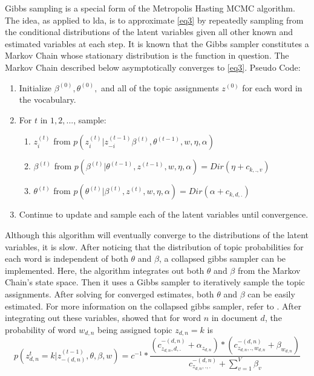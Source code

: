 \documentclass[3p,times]{elsarticle}
\begin{document}
\noindent Gibbs sampling is a special form of the Metropolis Hasting MCMC algorithm. The idea, as applied to lda, is to approximate \ref{eq3} by repeatedly sampling from the conditional distributions of the latent variables given all other known and estimated variables at each step. It is known that the Gibbs sampler constitutes a Markov Chain whose stationary distribution is the function in question. The Markov Chain described below asymptotically converges to \ref{eq3}. Pseudo Code:
\begin{enumerate}
	\item Initialize $\beta^{(0)}, \theta^{(0)},$ and all of the topic assignments $z^{(0)}$ for each word in the vocabulary.
	\item For $t$ in $1,2,...$, sample:
	\begin{enumerate}
		\item $z^{(t)}_{i}$ from $p(z_{i}^{(t)} | z^{(t-1)}_{-i} \beta^{(t)}, \theta^{(t-1)}, w, \eta, \alpha)$
		\item $\beta^{(t)}$ from $p(\beta^{(t)} | \theta^{(t-1)}, z^{(t-1)}, w, \eta, \alpha)=Dir(\eta+c_{k,.,v})$
		\item $\theta^{(t)}$ from $p(\theta^{(t)} | \beta^{(t)}, z^{(t)}, w, \eta, \alpha)=Dir(\alpha+c_{k,d,.})$
	\end{enumerate}
	\item Continue to update and sample each of the latent variables until convergence.
\end{enumerate}


\noindent Although this algorithm will eventually converge to the distributions of the latent variables, it is slow. After noticing that the distribution of topic probabilities for each word is independent of both $\theta$ and $\beta$, a collapsed gibbs sampler can be implemented. Here, the algorithm integrates out both $\theta$ and $\beta$ from the Markov Chain's state space. Then it uses a Gibbs sampler to iteratively sample the topic assignments. After solving for converged estimates, both $\theta$ and $\beta$ can be easily estimated. For more information on the collapsed gibbs sampler, refer to \cite{CGSTheory}. After integrating out these variables, \cite{multinom} showed that for word $n$ in document $d$, the probability of word $w_{d,n}$ being assigned topic $z_{d,n}=k$ is 
\begin{equation} \label{eq4}
p( z^{t}_{d,n}=k| z^{(t-1)}_{-(d,n)}, \theta, \beta, w) =c^{-1}*\frac{(c^{-(d,n)}_{z_{d,n},d,.}+\alpha_{z_{d,n}})*(c^{-(d,n)}_{z_{d,n},.,w_{d,n}}+\beta_{w_{d,n}})}{c^{-(d,n)}_{z_{d,n},.,.}+\sum_{v=1}^{V}{\beta_{v}}} 
\end{equation}
\end{document}
